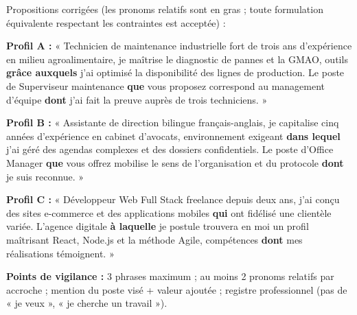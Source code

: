 \documentclass[11pt]{article}
\begin{document}
\begin{corrige}
Propositions corrigées (les pronoms relatifs sont en gras ; toute formulation équivalente respectant les contraintes est acceptée) :

\textbf{Profil A :} « Technicien de maintenance industrielle fort de trois ans d'expérience en milieu agroalimentaire, je maîtrise le diagnostic de pannes et la GMAO, outils \textbf{grâce auxquels} j'ai optimisé la disponibilité des lignes de production. Le poste de Superviseur maintenance \textbf{que} vous proposez correspond au management d'équipe \textbf{dont} j'ai fait la preuve auprès de trois techniciens. »

\textbf{Profil B :} « Assistante de direction bilingue français-anglais, je capitalise cinq années d'expérience en cabinet d'avocats, environnement exigeant \textbf{dans lequel} j'ai géré des agendas complexes et des dossiers confidentiels. Le poste d'Office Manager \textbf{que} vous offrez mobilise le sens de l'organisation et du protocole \textbf{dont} je suis reconnue. »

\textbf{Profil C :} « Développeur Web Full Stack freelance depuis deux ans, j'ai conçu des sites e-commerce et des applications mobiles \textbf{qui} ont fidélisé une clientèle variée. L'agence digitale \textbf{à laquelle} je postule trouvera en moi un profil maîtrisant React, Node.js et la méthode Agile, compétences \textbf{dont} mes réalisations témoignent. »

\textbf{Points de vigilance :} 3 phrases maximum ; au moins 2 pronoms relatifs par accroche ; mention du poste visé + valeur ajoutée ; registre professionnel (pas de « je veux », « je cherche un travail »).
\end{corrige}
\end{document}
